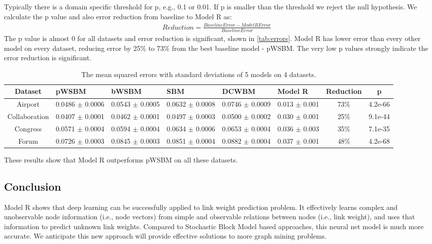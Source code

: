 \documentclass{article}
\begin{document}
Typically there is a domain specific threshold for p, e.g., 0.1 or 0.01. If p is smaller than the threshold we reject the null hypothesis.
We calculate the p value and also error reduction from baseline to Model R as:
\begin{align*}
Reduction = \frac{BaselineError - ModelRError}{BaselineError}
\end{align*}
The p value is almost 0 for all datasets and error reduction is significant,
shown in \autoref{tab:errors}.
Model R has lower error than every other model on every dataset,
reducing error by 25\% to 73\% from the best baseline model - pWSBM.
The very low p values strongly indicate the error reduction is significant.
\begin{table}[!htb]\centering
	\caption{
		The mean squared errors with standard deviations of 5 models on 4 datasets.
	}
	\begin{tabularx}{\textwidth}{|c|X|X|X|X|X|c|c|} \hline \rowcolor{blue!40}
		Dataset & pWSBM & bWSBM & SBM & DCWBM & Model R & Reduction & p \\ \hline
		Airport & 0.0486 $ \pm $ 0.0006 & 0.0543 $ \pm $ 0.0005 & 0.0632 $ \pm $ 0.0008 & 0.0746 $ \pm $ 0.0009 & 0.013 $ \pm $ 0.001 & 73\% & 4.2e-66 \\ \hline
		Collaboration & 0.0407 $ \pm $ 0.0001 & 0.0462 $ \pm $ 0.0001 & 0.0497 $ \pm $ 0.0003 & 0.0500 $ \pm $ 0.0002 & 0.030 $ \pm $ 0.001 & 25\% & 9.1e-44 \\ \hline
		Congress & 0.0571 $ \pm $ 0.0004 & 0.0594 $ \pm $ 0.0004 & 0.0634 $ \pm $ 0.0006 & 0.0653 $ \pm $ 0.0004 & 0.036 $ \pm $ 0.003 & 35\% & 7.1e-35 \\ \hline
		Forum & 0.0726 $ \pm $ 0.0003 & 0.0845 $ \pm $ 0.0003 & 0.0851 $ \pm $ 0.0004 & 0.0882 $ \pm $ 0.0004 & 0.037 $ \pm $ 0.001 & 48\% & 4.2e-68 \\ \hline
	\end{tabularx}
	\label{tab:errors}
\end{table}
These results show that Model R outperforms pWSBM on all these datasets.

\subsection{Conclusion}
Model R shows that deep learning can be successfully applied to link weight prediction problem.
It effectively learns complex and unobservable node information (i.e., node vectors) from simple and observable relations between nodes (i.e., link weight),
and uses that information to predict unknown link weights.
Compared to Stochastic Block Model based approaches,
this neural net model is much more accurate.
We anticipate this new approach will provide effective solutions to more
graph mining problems.
\end{document}
